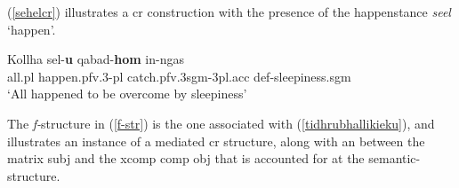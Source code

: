 \documentclass[output=paper]{LSP/langsci}
\begin{document}
(\ref{sehelcr}) illustrates a {\sc cr} construction with the presence of the happenstance  \emph{se\textcrh el} `happen'.  

\ea \label{sehelcr}
\gll Kollha se\textcrh l-{\bf{u}} qabad-{\bf{hom}} in-ng\textcrh as\\
all.{\sc pl} happen.{\sc pfv.3-pl} catch.{\sc pfv.3sgm-3pl.acc} {\sc def-}sleepiness.{\sc sgm}\\
\glt `All happened to be overcome by sleepiness' \hfill{\citep[24]{Alotaibi2013}}
\z

The \emph{f-}structure in (\ref{f-str}) is the one associated with (\ref{tidhrubhallikieku}), and illustrates an instance of a mediated {\sc cr} structure, along with an  between the matrix {\sc subj} and the {\sc xcomp comp obj}\textsubscript{\texttheta} that is accounted for at the semantic-structure. 
\end{document}

